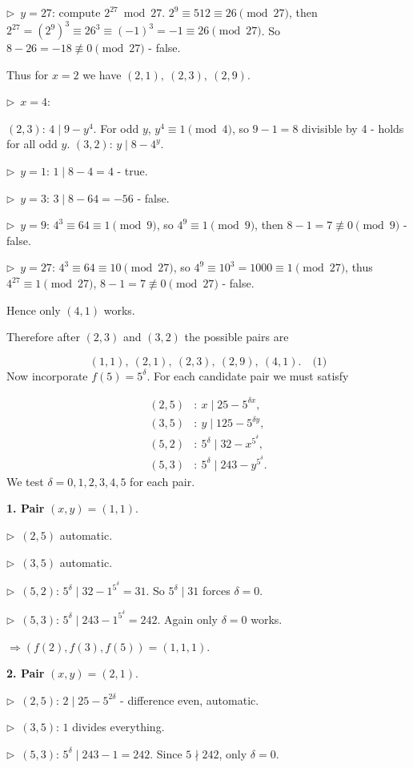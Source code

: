 \documentclass{llmxive}
\providecommand{\compactbullet}[1]{\par\noindent$\triangleright$~#1\par}
\begin{document}
\compactbullet{\(y=27\): compute \(2^{27}\bmod27\). \(2^{9}\equiv512\equiv26\pmod{27}\), then \(2^{27}=(2^{9})^{3}\equiv26^{3}\equiv(-1)^{3}=-1\equiv26\pmod{27}\). So \(8-26=-18\not\equiv0\pmod{27}\) - false.}
Thus for \(x=2\) we have \((2,1),\ (2,3),\ (2,9)\).\par
\compactbullet{\textbf{}\(x=4\):\textbf{}}
\((2,3)\): \(4\mid 9-y^{4}\). For odd \(y\), \(y^{4}\equiv1\pmod4\), so \(9-1=8\) divisible by 4 - holds for all odd \(y\). \((3,2)\): \(y\mid 8-4^{y}\).\par
\compactbullet{\(y=1\): \(1\mid8-4=4\) - true.}
\compactbullet{\(y=3\): \(3\mid 8-64=-56\) - false.}
\compactbullet{\(y=9\): \(4^{3}\equiv64\equiv1\pmod9\), so \(4^{9}\equiv1\pmod9\), then \(8-1=7\not\equiv0\pmod9\) - false.}
\compactbullet{\(y=27\): \(4^{3}\equiv64\equiv10\pmod{27}\), so \(4^{9}\equiv10^{3}=1000\equiv1\pmod{27}\), thus \(4^{27}\equiv1\pmod{27}\), \(8-1=7\not\equiv0\pmod{27}\) - false.}
Hence only \((4,1)\) works.\par
Therefore after \((2,3)\) and \((3,2)\) the possible pairs are\par
\[
(1,1),\ (2,1),\ (2,3),\ (2,9),\ (4,1). \quad\text{(1)}
\]
Now incorporate \(f(5)=5^{\delta}\). For each candidate pair we must satisfy\par
\[
\begin{aligned}
(2,5)&:\ x\mid 25-5^{\delta x},\\
(3,5)&:\ y\mid 125-5^{\delta y},\\
(5,2)&:\ 5^{\delta}\mid 32 - x^{5^{\delta}},\\
(5,3)&:\ 5^{\delta}\mid 243 - y^{5^{\delta}}.
\end{aligned}
\]
We test \(\delta=0,1,2,3,4,5\) for each pair.\par
\smallskip
\textbf{1. Pair }\((x,y)=(1,1)\).\textbf{}\par
\compactbullet{\((2,5)\) automatic.}
\compactbullet{\((3,5)\) automatic.}
\compactbullet{\((5,2)\): \(5^{\delta}\mid 32-1^{5^{\delta}}=31\). So \(5^{\delta}\mid31\) forces \(\delta=0\).}
\compactbullet{\((5,3)\): \(5^{\delta}\mid 243-1^{5^{\delta}}=242\). Again only \(\delta=0\) works.}
\(\Rightarrow (f(2),f(3),f(5))=(1,1,1)\).\par
\smallskip
\textbf{2. Pair }\((x,y)=(2,1)\).\textbf{}\par
\compactbullet{\((2,5)\): \(2\mid 25-5^{2\delta}\) - difference even, automatic.}
\compactbullet{\((3,5)\): \(1\) divides everything.}
\compactbullet{\((5,3)\): \(5^{\delta}\mid 243-1=242\). Since \(5\nmid242\), only \(\delta=0\).}
\end{document}
